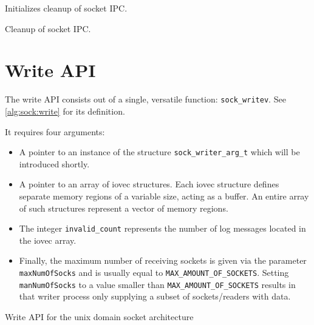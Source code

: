 \begin{algorithm}[h!]
    
    \caption[Socket: Socket finalization]{Initializes cleanup of socket \ac{IPC}.}
    \label{alg:sock:finalize}
\end{algorithm}

\begin{algorithm}[h!]
    
    \caption[Socket: Socket cleanup]{Cleanup of socket \ac{IPC}.}
    \label{alg:sock:cleanup}
\end{algorithm}

\section{Write \ac{API}}
\label{cha:WriteAPI}
The write \ac{API} consists out of a single, versatile function\@: \texttt{sock\_writev}.
See \ref{alg:sock:write} for its definition.

It requires four arguments:
\begin{itemize}
    \item A pointer to an instance of the structure \texttt{sock\_writer\_arg\_t} which will be introduced shortly.
    \item A pointer to an array of iovec structures.
            Each iovec structure defines separate memory regions of a variable size, acting as a buffer.
            An entire array of such structures represent a vector of memory regions\cite{man:iovec}.
    \item The integer \texttt{invalid\_count} represents the number of log messages located in the iovec array.
    \item Finally, the maximum number of receiving sockets is given via the parameter \texttt{maxNumOfSocks} and is usually equal to \texttt{MAX\_AMOUNT\_OF\_SOCKETS}.
            Setting \texttt{manNumOfSocks} to a value smaller than \texttt{MAX\_AMOUNT\_OF\_SOCKETS} results in that writer process only supplying a subset of sockets/readers with data.
\end{itemize}

\begin{algorithm}[h!]
    
    \caption[Socket: Write \ac{API}]{Write \ac{API} for the unix domain socket architecture}
    \label{alg:sock:write}
\end{algorithm}

